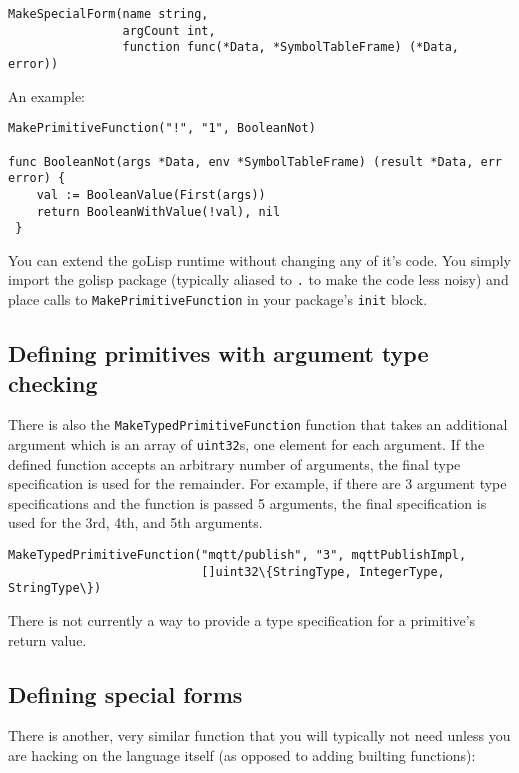 \documentclass{article}
\begin{document}
\begin{verbatim}
MakeSpecialForm(name string,
                argCount int,
                function func(*Data, *SymbolTableFrame) (*Data, error))
\end{verbatim}

An example:

\begin{verbatim}
MakePrimitiveFunction("!", "1", BooleanNot)

func BooleanNot(args *Data, env *SymbolTableFrame) (result *Data, err error) {
    val := BooleanValue(First(args))
    return BooleanWithValue(!val), nil
 }
\end{verbatim}

You can extend the goLisp runtime without changing any of it's code. You simply import the
golisp package (typically aliased to \verb|.| to make the code less noisy) and place calls
to \verb|MakePrimitiveFunction| in your package's \verb|init| block.

\subsection{Defining primitives with argument type checking}\label{sec:defining-primitives-with-argument-type-checking}

There is also the \verb|MakeTypedPrimitiveFunction| function that takes an additional
argument which is an array of \verb|uint32|s, one element for each argument. If the defined
function accepts an arbitrary number of arguments, the final type specification is used for
the remainder. For example, if there are 3 argument type specifications and the function is
passed 5 arguments, the final specification is used for the 3rd, 4th, and 5th arguments.

\begin{verbatim}
MakeTypedPrimitiveFunction("mqtt/publish", "3", mqttPublishImpl, 
                           []uint32\{StringType, IntegerType, StringType\})
\end{verbatim}

There is not currently a way to provide a type specification for a primitive's return value.

\subsection{Defining special forms}\label{sec:defining-special-forms}

There is another, very similar function that you will typically not need unless you are
hacking on the language itself (as opposed to adding builting functions):
\end{document}
